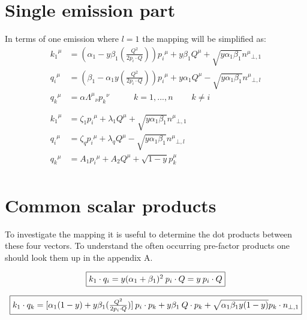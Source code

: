 \section{Single emission part}
In terms of one emission where $ l=1 $ the mapping will be simplified as:
\begin{equation}
	\begin{aligned}
	{k_1}^{\mu} &= (\alpha_1 -y\beta_1(\frac{Q^2}{2p_i \cdot Q})) {p_i}^{\mu} + y\beta_1{Q}^{\mu} + \sqrt{y\alpha_1\beta_1}{n^{\mu}}_{\bot,1}  \\
	{q_i}^{\mu}   &= (\beta_1 -\alpha_1 y(\frac{Q^2}{2p_i \cdot Q})){p_i}^{\mu} + y\alpha_1{Q}^{\mu} - \sqrt{y\alpha_1\beta_1}{n^{\mu}}_{\bot,l} \\
	{q_k}^{\mu} &= \alpha {\Lambda^{\mu}}_{\nu}{p_k}^{\nu} \:\:\:\:\:\:\:\:\:\:\:\:\: {k=1,...,n}\:\:\:\:\:\:\:\:\:\:k\neq i\\
	\\
	\\
		{k_1}^{\mu} &= \zeta_1 {p_i}^{\mu} + \lambda_1{Q}^{\mu} + \sqrt{y\alpha_1\beta_1}{n^{\mu}}_{\bot,1}  \\
	{q_i}^{\mu}   &= \zeta_q{p_i}^{\mu} + \lambda_q{Q}^{\mu} - \sqrt{y\alpha_1\beta_1}{n^{\mu}}_{\bot,l} \\
	{q_k}^{\mu} &= A_1{p_i}^{\mu} + A_2{Q}^{\mu} + \sqrt{1-y}{p_k^{\mu}}\\
    \end{aligned}
\end{equation}


\section{Common scalar products}
To investigate the mapping it is useful to determine the dot products between these four vectors. To understand the often occurring pre-factor products one should look them up in the appendix A.

\begin{equation}
	\begin{aligned}
		\fbox{$  k_1 \cdot q_i=y({\alpha_1}+\beta_1)^2\:p_i\cdot Q = y\:p_i\cdot Q $}
    \end{aligned}
\label{fistScalarProduct}
\end{equation}

\begin{equation}
	\begin{aligned}
		\fbox{$  k_1 \cdot q_k = [\alpha_1 (1-y)+y\beta_1(\frac{Q^2}{2p_i \cdot Q})]\:p_i \cdot p_k+y\beta_1\:Q\cdot p_k+\sqrt{\alpha_1\beta_1y(1-y)} p_k \cdot {n_{\bot,1}} $}
    \end{aligned}
\end{equation}

